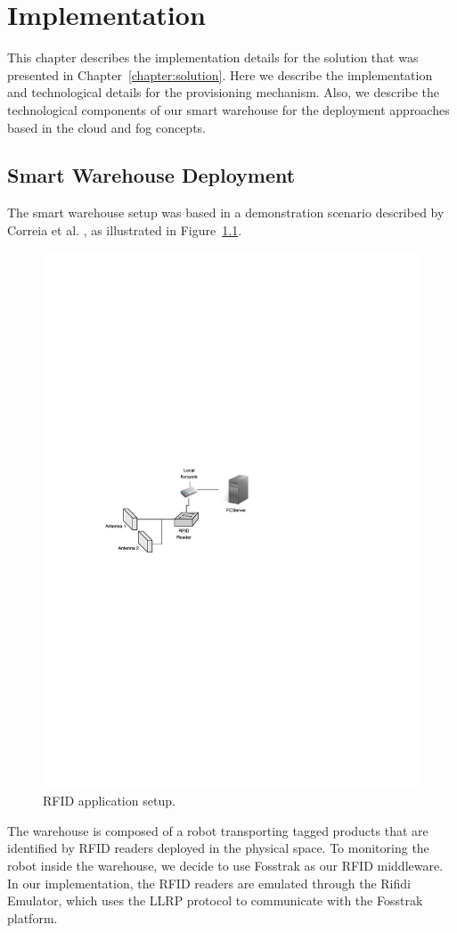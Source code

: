
\chapter{Implementation}
\label{chapter:implementation}
This chapter describes the implementation details for the solution that was presented in Chapter~\ref{chapter:solution}.
Here we describe the implementation and technological details for the provisioning mechanism.
Also, we describe the technological components of our smart warehouse for the deployment approaches
based in the cloud and fog concepts.

\section{Smart Warehouse Deployment}
\label{sec:impl_smart_place}
The smart warehouse setup was based in a demonstration scenario described by Correia et al. \cite{correiaalpharfid},
as illustrated in Figure~\ref{fig:rfidapp_setup}.\\

\begin{figure}[ht!]
  \centering
  \includegraphics[width=.6\textwidth]{./images/rfidapp_setup}
  \caption[RFID application setup.]{RFID application setup.}
  \label{fig:rfidapp_setup}
\end{figure}

The warehouse is composed of a robot transporting tagged products that are identified by \gls{RFID} readers
deployed in the physical space. To monitoring the robot inside the warehouse, we decide to use Fosstrak
as our \gls{RFID} middleware. In our implementation, the \gls{RFID} readers are emulated through the
Rifidi Emulator, which uses the \gls{LLRP} protocol to communicate with the Fosstrak platform.

